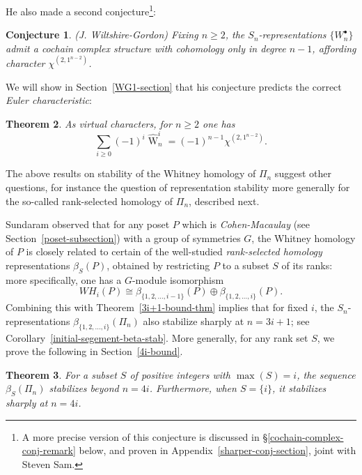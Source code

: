 \documentclass[12pt]{amsart}
\theoremstyle{plain}
\newtheorem{thm}{Theorem}[section]
\newtheorem{conj}[thm]{Conjecture}
\theoremstyle{definition}
\begin{document}
\noindent
He also made a second conjecture\footnote{A more precise version 
of this conjecture is discussed in \S\ref{cochain-complex-conj-remark} below, and proven in Appendix~\ref{sharper-conj-section}, joint with Steven Sam.}:

\begin{conj}(J. Wiltshire-Gordon)
\label{Wiltshire-Gordon-Conjecture1}
Fixing $n \geq 2$, the $S_n$-representations
$\{W_n^\bullet\}$ admit a cochain 
complex structure with cohomology 
only in degree $n-1$,
affording character $\chi^{(2,1^{n-2})}$.
\end{conj}

\noindent
We will show in
Section~\ref{WG1-section}
that his conjecture predicts the
correct {\it Euler characteristic}:

\begin{thm}
\label{W-G-conj-2-euler-char}
As virtual characters, for $n \geq 2$ one has
$$
\sum_{i \geq 0} (-1)^i \widehat{{\operatorname{W}}}^i_n = (-1)^{n-1} \chi^{(2,1^{n-2})}.
$$
\end{thm}

The above results on stability of the Whitney homology of $\Pi_n$ 
suggest other questions, for instance the question of representation stability more generally for the so-called rank-selected homology of $\Pi_n$, described next.    

 
Sundaram \cite[Prop. 1.9]{Sundaram} observed that for any 
poset $P$ which is {\it Cohen-Macaulay} 
(see Section~\ref{poset-subsection})
with a group of symmetries $G$,
the Whitney homology of $P$ is closely related to certain
of the well-studied {\it rank-selected homology} representations $\beta_S(P)$, 
obtained by restricting $P$ to a subset $S$ of its ranks: more specifically, 
one has a $G$-module isomorphism
$$
WH_i(P) \cong 
  \beta_{\{1,2,\ldots,i-1\}}(P)
 \oplus \beta_{\{1,2,\ldots,i\}}(P).
$$
Combining this with Theorem~\ref{3i+1-bound-thm}
implies that for fixed $i$,
the $S_n$-representations $\beta_{\{1,2,\ldots,i\}}(\Pi_n)$
also stabilize sharply at $n=3i+1$;  
see Corollary~\ref{initial-segement-beta-stab}. 
More generally, for any rank set $S$, we 
prove the following in Section~\ref{4i-bound}.

\begin{thm}
\label{beta-stabilization-thm}
For a subset $S$ of positive integers with $\max(S)=i$,
the sequence $\beta_S(\Pi_n)$ stabilizes beyond $n=4i$.
Furthermore, when $S=\{i\}$, it stabilizes sharply at $n=4i$.
\end{thm}
\end{document}
